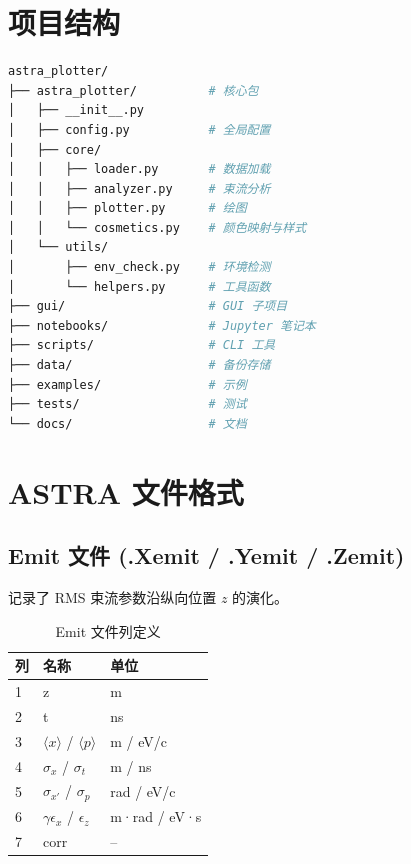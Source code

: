 \documentclass[11pt,a4paper]{article}
\begin{document}
\section{项目结构}

\begin{lstlisting}[language=bash]
astra_plotter/
├── astra_plotter/          # 核心包
│   ├── __init__.py
│   ├── config.py           # 全局配置
│   ├── core/
│   │   ├── loader.py       # 数据加载
│   │   ├── analyzer.py     # 束流分析
│   │   ├── plotter.py      # 绘图
│   │   └── cosmetics.py    # 颜色映射与样式
│   └── utils/
│       ├── env_check.py    # 环境检测
│       └── helpers.py      # 工具函数
├── gui/                    # GUI 子项目
├── notebooks/              # Jupyter 笔记本
├── scripts/                # CLI 工具
├── data/                   # 备份存储
├── examples/               # 示例
├── tests/                  # 测试
└── docs/                   # 文档
\end{lstlisting}

\section{ASTRA 文件格式}

\subsection{Emit 文件 (.Xemit / .Yemit / .Zemit)}

记录了 RMS 束流参数沿纵向位置 $z$ 的演化。

\begin{table}[h]
\centering
\caption{Emit 文件列定义}
\begin{tabular}{@{}lll@{}}
\toprule
\textbf{列} & \textbf{名称} & \textbf{单位} \\
\midrule
1 & z      & m \\
2 & t      & ns \\
3 & $\langle x \rangle$ / $\langle p \rangle$ & m / eV/c \\
4 & $\sigma_x$ / $\sigma_t$ & m / ns \\
5 & $\sigma_{x'}$ / $\sigma_p$ & rad / eV/c \\
6 & $\gamma\epsilon_x$ / $\epsilon_z$ & m·rad / eV·s \\
7 & corr   & -- \\
\bottomrule
\end{tabular}
\end{table}
\end{document}

